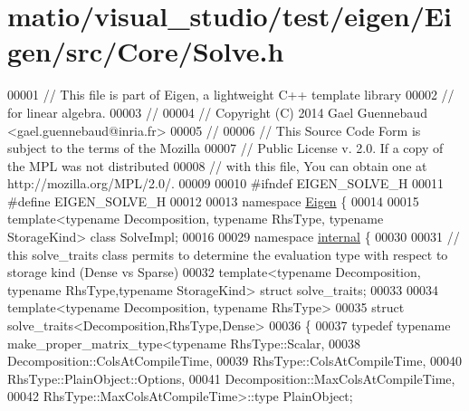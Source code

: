 \hypertarget{matio_2visual__studio_2test_2eigen_2_eigen_2src_2_core_2_solve_8h_source}{}\section{matio/visual\+\_\+studio/test/eigen/\+Eigen/src/\+Core/\+Solve.h}
\label{matio_2visual__studio_2test_2eigen_2_eigen_2src_2_core_2_solve_8h_source}

\begin{DoxyCode}
00001 \textcolor{comment}{// This file is part of Eigen, a lightweight C++ template library}
00002 \textcolor{comment}{// for linear algebra.}
00003 \textcolor{comment}{//}
00004 \textcolor{comment}{// Copyright (C) 2014 Gael Guennebaud <gael.guennebaud@inria.fr>}
00005 \textcolor{comment}{//}
00006 \textcolor{comment}{// This Source Code Form is subject to the terms of the Mozilla}
00007 \textcolor{comment}{// Public License v. 2.0. If a copy of the MPL was not distributed}
00008 \textcolor{comment}{// with this file, You can obtain one at http://mozilla.org/MPL/2.0/.}
00009 
00010 \textcolor{preprocessor}{#ifndef EIGEN\_SOLVE\_H}
00011 \textcolor{preprocessor}{#define EIGEN\_SOLVE\_H}
00012 
00013 \textcolor{keyword}{namespace }\hyperlink{namespace_eigen}{Eigen} \{
00014 
00015 \textcolor{keyword}{template}<\textcolor{keyword}{typename} Decomposition, \textcolor{keyword}{typename} RhsType, \textcolor{keyword}{typename} StorageKind> \textcolor{keyword}{class }SolveImpl;
00016   
00029 \textcolor{keyword}{namespace }\hyperlink{namespaceinternal}{internal} \{
00030 
00031 \textcolor{comment}{// this solve\_traits class permits to determine the evaluation type with respect to storage kind (Dense vs
       Sparse)}
00032 \textcolor{keyword}{template}<\textcolor{keyword}{typename} Decomposition, \textcolor{keyword}{typename} RhsType,\textcolor{keyword}{typename} StorageKind> \textcolor{keyword}{struct }solve\_traits;
00033 
00034 \textcolor{keyword}{template}<\textcolor{keyword}{typename} Decomposition, \textcolor{keyword}{typename} RhsType>
00035 \textcolor{keyword}{struct }solve\_traits<Decomposition,RhsType,Dense>
00036 \{
00037   \textcolor{keyword}{typedef} \textcolor{keyword}{typename} make\_proper\_matrix\_type<\textcolor{keyword}{typename} RhsType::Scalar,
00038                  Decomposition::ColsAtCompileTime,
00039                  RhsType::ColsAtCompileTime,
00040                  RhsType::PlainObject::Options,
00041                  Decomposition::MaxColsAtCompileTime,
00042                  RhsType::MaxColsAtCompileTime>::type PlainObject;

\end{DoxyCode}
